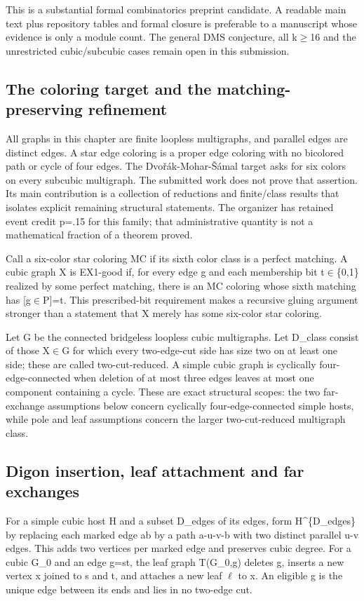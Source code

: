 \documentclass[11pt,a4paper]{article}
\begin{document}
This is a substantial formal combinatorics preprint candidate. A readable main text plus repository tables and formal closure is preferable to a manuscript whose evidence is only a module count. The general DMS conjecture, all k\ensuremath{\geq}16 and the unrestricted cubic/subcubic cases remain open in this submission.

\subsection{The coloring target and the matching-preserving refinement}
All graphs in this chapter are finite loopless multigraphs, and parallel edges are distinct edges. A star edge coloring is a proper edge coloring with no bicolored path or cycle of four edges. The Dvořák-Mohar-Šámal target asks for six colors on every subcubic multigraph. The submitted work does not prove that assertion. Its main contribution is a collection of reductions and finite/class results that isolates explicit remaining structural statements. The organizer has retained event credit p=.15 for this family; that administrative quantity is not a mathematical fraction of a theorem proved.

Call a six-color star coloring MC if its sixth color class is a perfect matching. A cubic graph X is EX1-good if, for every edge g and each membership bit t\ensuremath{\in}\{0,1\} realized by some perfect matching, there is an MC coloring whose sixth matching has [g\ensuremath{\in}P]=t. This prescribed-bit requirement makes a recursive gluing argument stronger than a statement that X merely has some six-color star coloring.

Let G be the connected bridgeless loopless cubic multigraphs. Let D\_class consist of those X\ensuremath{\in}G for which every two-edge-cut side has size two on at least one side; these are called two-cut-reduced. A simple cubic graph is cyclically four-edge-connected when deletion of at most three edges leaves at most one component containing a cycle. These are exact structural scopes: the two far-exchange assumptions below concern cyclically four-edge-connected simple hosts, while pole and leaf assumptions concern the larger two-cut-reduced multigraph class.

\subsection{Digon insertion, leaf attachment and far exchanges}
For a simple cubic host H and a subset D\_edges of its edges, form H\textasciicircum{}\{D\_edges\} by replacing each marked edge ab by a path a-u-v-b with two distinct parallel u-v edges. This adds two vertices per marked edge and preserves cubic degree. For a cubic G\_0 and an edge g=st, the leaf graph T(G\_0,g) deletes g, inserts a new vertex x joined to s and t, and attaches a new leaf \ensuremath{\ell} to x. An eligible g is the unique edge between its ends and lies in no two-edge cut.
\end{document}
